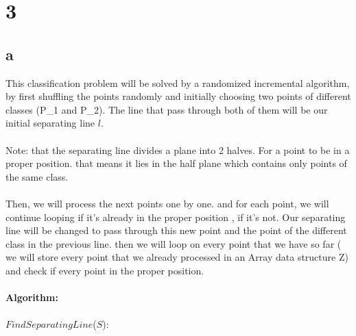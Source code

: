 
\section*{3}
\subsection*{a}

This classification problem will be solved by a randomized incremental algorithm, by first shuffling the points randomly and initially choosing two points of different classes (P_1 and P_2). The line that pass through both  of them will be our initial separating line $l$. \\
\\
Note: that the separating line divides a plane into 2 halves. For a point to be in a proper position. that means it lies in the half plane which contains only points of the same class. \\
\\
Then, we will process the next points one by one. and for each point, we will continue looping if it's already in the proper position , if it's not. Our separating line will be changed to pass through this new point and the point of the different class in the previous line. then we will loop on every point that we have so far ( we will store every point that we already processed in an Array data structure Z) and check if every point in the proper position. 
\\
\\
\textbf{Algorithm:}\\
\\
$FindSeparatingLine$($S$):
